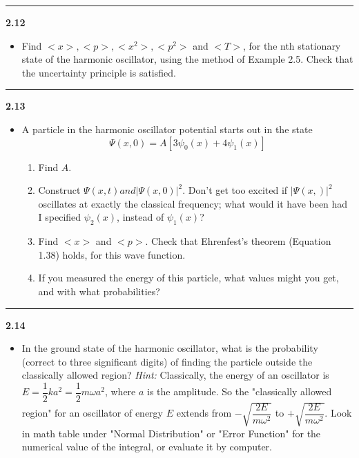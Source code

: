 \documentclass[fleqn]{article}
\begin{document}
  \rule{15cm}{1pt}

  \textbf{2.12}
  \begin{itemize}
    \item Find $<x>, <p>, <x^2>, <p^2>$ and $<T>$, for the nth stationary state of the harmonic oscillator,
    using the method of Example 2.5. Check that the uncertainty principle is satisfied. 
  \end{itemize}

  \rule{15cm}{1pt}

  \textbf{2.13}
  \begin{itemize}
    \item A particle in the harmonic oscillator potential starts out in the state 
    $$\Psi(x, 0)=A \left[3\psi_0(x)+4\psi_1(x)\right]$$ 
    \begin{enumerate}
      \item Find $A$.

      \item Construct $\Psi(x, t) and |\Psi(x, 0)|^2$. Don't get too excited if $|\Psi(x, )|^2$ oscillates 
      at exactly the classical frequency; what would it have been had I specified $\psi_2(x)$, instead of
      $\psi_1(x)$?

      \item Find $<x>$ and $<p>$. Check that Ehrenfest's theorem (Equation 1.38) holds, for this wave function.

      \item If you measured the energy of this particle, what values might you get, and with what probabilities?
    \end{enumerate}
  \end{itemize}

  \rule{15cm}{1pt}

  \textbf{2.14}
  \begin{itemize}
    \item In the ground state of the harmonic oscillator, what is the probability (correct to three
    significant digits) of finding the particle outside the classically allowed region?
    \emph{Hint:} Classically, the energy of an oscillator is $E=\dfrac{1}{2}ka^2=\dfrac{1}{2}m \omega a^2$,
    where $a$ is the amplitude. So the "classically allowed region" for an oscillator of energy $E$
    extends from $-\sqrt{\dfrac{2E}{m \omega^2}}$ to $+\sqrt{\dfrac{2E}{m \omega^2}}$. Look in math table
    under "Normal Distribution" or "Error Function" for the numerical value of the integral, or evaluate
    it by computer.
  \end{itemize}
\end{document}
